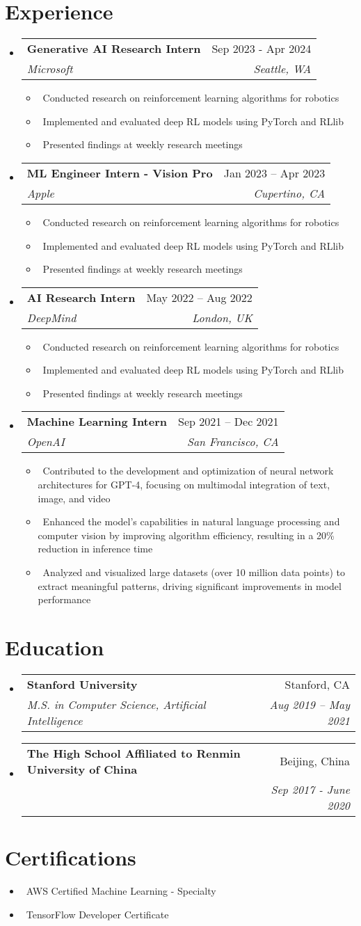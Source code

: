 \documentclass[letterpaper,10pt]{article}
\makeatletter
\newcommand{\resumeItem}[1]{\item\small{#1}}
\newcommand{\resumeSubheading}[4]{
\vspace{-1pt}\item
  \begin{tabular*}{0.97\textwidth}[t]{l@{\extracolsep{\fill}}r}
    \textbf{#1} & #2 \\
    \textit{#3} & \textit{#4} \\
  \end{tabular*}\vspace{-7pt}
}
\newcommand{\resumeSubHeadingList}{\begin{itemize}[leftmargin=0.15in, label={}]}
\newcommand{\resumeSubHeadingListEnd}{\end{itemize}}
\makeatother
\begin{document}
\section{Experience}
\resumeSubHeadingList
  \resumeSubheading
      {Generative AI Research Intern}{Sep 2023 - Apr 2024}
      {Microsoft}{Seattle, WA}
      \resumeSubHeadingList
          \resumeItem{\textbullet\ Conducted research on reinforcement learning algorithms for robotics}
          \resumeItem{\textbullet\ Implemented and evaluated deep RL models using PyTorch and RLlib}
          \resumeItem{\textbullet\ Presented findings at weekly research meetings}
    \resumeSubHeadingListEnd
  \resumeSubheading
      {ML Engineer Intern - Vision Pro}{Jan 2023 -- Apr 2023}
      {Apple}{Cupertino, CA}
      \resumeSubHeadingList
          \resumeItem{\textbullet\ Conducted research on reinforcement learning algorithms for robotics}
          \resumeItem{\textbullet\ Implemented and evaluated deep RL models using PyTorch and RLlib}
          \resumeItem{\textbullet\ Presented findings at weekly research meetings}
    \resumeSubHeadingListEnd
  \resumeSubheading
      {AI Research Intern}{May 2022 -- Aug 2022}
      {DeepMind}{London, UK}
      \resumeSubHeadingList
          \resumeItem{\textbullet\ Conducted research on reinforcement learning algorithms for robotics}
          \resumeItem{\textbullet\ Implemented and evaluated deep RL models using PyTorch and RLlib}
          \resumeItem{\textbullet\ Presented findings at weekly research meetings}
      \resumeSubHeadingListEnd
  \resumeSubheading
      {Machine Learning Intern}{Sep 2021 -- Dec 2021}
      {OpenAI}{San Francisco, CA}
      \resumeSubHeadingList
          \resumeItem{\textbullet\ Contributed to the development and optimization of neural network architectures for GPT-4, focusing on multimodal integration of text, image, and video }
          \resumeItem{\textbullet\ Enhanced the model's capabilities in natural language processing and computer vision by improving algorithm efficiency, resulting in a 20\% reduction in inference time}
          \resumeItem{\textbullet\ Analyzed and visualized large datasets (over 10 million data points) to extract meaningful patterns, driving significant improvements in model performance}
      \resumeSubHeadingListEnd
\resumeSubHeadingListEnd

\section{Education}
\resumeSubHeadingList
  \resumeSubheading
      {Stanford University}{Stanford, CA}
      {M.S. in Computer Science, Artificial Intelligence}{Aug 2019 -- May 2021}
  \resumeSubheading
      {The High School Affiliated to Renmin University of China}{Beijing, China}
      {}{Sep 2017 - June 2020}
\resumeSubHeadingListEnd

\section{Certifications}
\resumeSubHeadingList
  \resumeItem{\textbullet\ AWS Certified Machine Learning - Specialty}
  \resumeItem{\textbullet\ TensorFlow Developer Certificate}
\resumeSubHeadingListEnd
\end{document}
